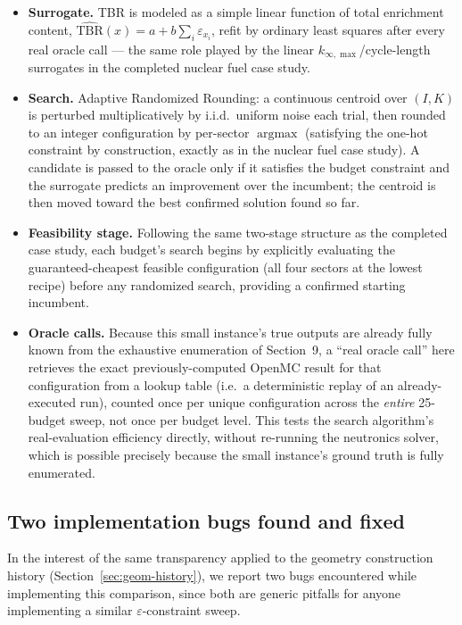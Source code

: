 \documentclass[11pt]{article}
\begin{document}
\begin{itemize}
\item \textbf{Surrogate.} TBR is modeled as a simple linear function of
total enrichment content, $\widehat{\mathrm{TBR}}(x) = a + b\sum_i \varepsilon_{x_i}$,
refit by ordinary least squares after every real oracle call --- the same
role played by the linear $k_{\infty,\max}$/cycle-length surrogates in the
completed nuclear fuel case study.
\item \textbf{Search.} Adaptive Randomized Rounding: a continuous centroid
over $(I,K)$ is perturbed multiplicatively by i.i.d.\ uniform noise each
trial, then rounded to an integer configuration by per-sector
$\operatorname{argmax}$ (satisfying the one-hot constraint by
construction, exactly as in the nuclear fuel case study). A candidate is
passed to the oracle only if it satisfies the budget constraint and the
surrogate predicts an improvement over the incumbent; the centroid is then
moved toward the best confirmed solution found so far.
\item \textbf{Feasibility stage.} Following the same two-stage structure
as the completed case study, each budget's search begins by explicitly
evaluating the guaranteed-cheapest feasible configuration (all four
sectors at the lowest recipe) before any randomized search, providing a
confirmed starting incumbent.
\item \textbf{Oracle calls.} Because this small instance's true outputs
are already fully known from the exhaustive enumeration of Section~9, a
``real oracle call'' here retrieves the exact previously-computed OpenMC
result for that configuration from a lookup table (i.e.\ a deterministic
replay of an already-executed run), counted once per unique configuration
across the \emph{entire} 25-budget sweep, not once per budget level. This
tests the search algorithm's real-evaluation efficiency directly, without
re-running the neutronics solver, which is possible precisely because the
small instance's ground truth is fully enumerated.
\end{itemize}

\subsection{Two implementation bugs found and fixed}

In the interest of the same transparency applied to the geometry
construction history (Section~\ref{sec:geom-history}), we report two bugs
encountered while implementing this comparison, since both are generic
pitfalls for anyone implementing a similar $\varepsilon$-constraint sweep.
\end{document}
